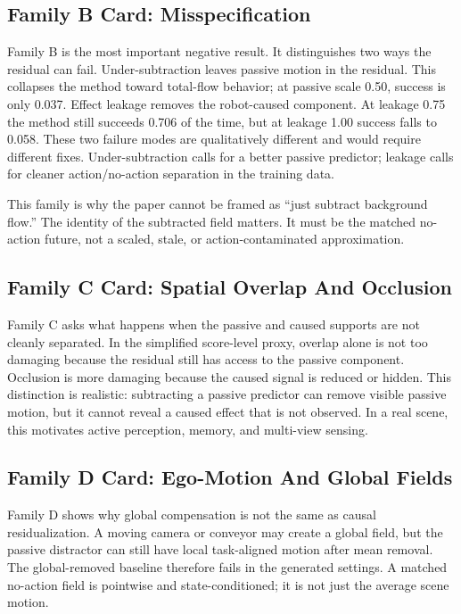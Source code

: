 \documentclass{article}
\begin{document}
\subsection{Family B Card: Misspecification}

Family B is the most important negative result.  It distinguishes two ways the residual
can fail.  Under-subtraction leaves passive motion in the residual.  This collapses the
method toward total-flow behavior; at passive scale 0.50, success is only 0.037.  Effect
leakage removes the robot-caused component.  At leakage 0.75 the method still succeeds
0.706 of the time, but at leakage 1.00 success falls to 0.058.  These two failure modes
are qualitatively different and would require different fixes.  Under-subtraction calls
for a better passive predictor; leakage calls for cleaner action/no-action separation in
the training data.

This family is why the paper cannot be framed as ``just subtract background flow.''  The
identity of the subtracted field matters.  It must be the matched no-action future, not a
scaled, stale, or action-contaminated approximation.

\subsection{Family C Card: Spatial Overlap And Occlusion}

Family C asks what happens when the passive and caused supports are not cleanly separated.
In the simplified score-level proxy, overlap alone is not too damaging because the
residual still has access to the passive component.  Occlusion is more damaging because
the caused signal is reduced or hidden.  This distinction is realistic: subtracting a
passive predictor can remove visible passive motion, but it cannot reveal a caused effect
that is not observed.  In a real scene, this motivates active perception, memory, and
multi-view sensing.

\subsection{Family D Card: Ego-Motion And Global Fields}

Family D shows why global compensation is not the same as causal residualization.  A
moving camera or conveyor may create a global field, but the passive distractor can still
have local task-aligned motion after mean removal.  The global-removed baseline therefore
fails in the generated settings.  A matched no-action field is pointwise and
state-conditioned; it is not just the average scene motion.
\end{document}

